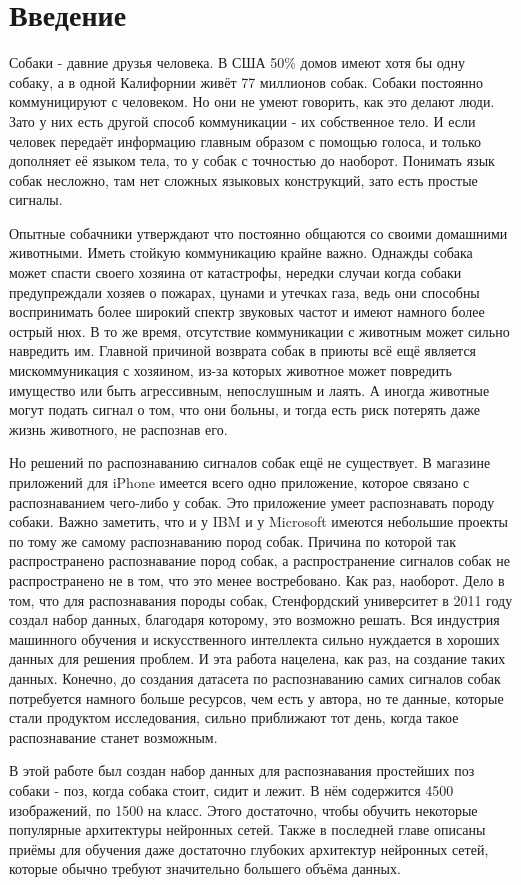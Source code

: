 \chapter*{Введение}							%

Собаки - давние друзья человека. В США 50\% домов имеют хотя бы одну собаку, а в одной Калифорнии живёт 77 миллионов собак. \cite{dog_ownership} Собаки постоянно коммуницируют с человеком. Но они не умеют говорить, как это делают люди. Зато у них есть другой способ коммуникации - их собственное тело. И если человек передаёт информацию главным образом с помощью голоса, и только дополняет её языком тела, то у собак с точностью до наоборот. Понимать язык собак несложно, там нет сложных языковых конструкций, зато есть простые сигналы. 

Опытные собачники утверждают что постоянно общаются со своими домашними животными. Иметь стойкую коммуникацию крайне важно. Однажды собака может спасти своего хозяина от катастрофы, нередки случаи когда собаки предупреждали хозяев о пожарах, цунами и утечках газа, ведь они способны воспринимать более широкий спектр звуковых частот и имеют намного более острый нюх. В то же время, отсутствие коммуникации с животным может сильно навредить им. Главной причиной возврата собак в приюты всё ещё является мискоммуникация с хозяином, из-за которых животное может повредить имущество или быть агрессивным, непослушным и лаять\cite{reasons_dogs_return_to_shelters}. А иногда животные могут подать сигнал о том, что они больны, и тогда есть риск потерять даже жизнь животного, не распознав его. 

Но решений по распознаванию сигналов собак ещё не существует. В магазине приложений для iPhone имеется всего одно приложение, которое связано с распознаванием чего-либо у собак. Это приложение умеет распознавать породу собаки. Важно заметить, что и у IBM\cite{ibm_dog} и у Microsoft\cite{microsoft_dog} имеются небольшие проекты по тому же самому распознаванию пород собак. Причина по которой так распространено распознавание пород собак, а распространение сигналов собак не распространено не в том, что это менее востребовано. Как раз, наоборот. Дело в том, что для распознавания породы собак, Стенфордский университет в 2011 году создал набор данных, благодаря которому, это возможно решать. Вся индустрия машинного обучения и искусственного интеллекта сильно нуждается в хороших данных для решения проблем. И эта работа нацелена, как раз, на создание таких данных. Конечно, до создания датасета по распознаванию самих сигналов собак потребуется намного больше ресурсов, чем есть у автора, но те данные, которые стали продуктом исследования, сильно приближают тот день, когда такое распознавание станет возможным.

В этой работе был создан набор данных для распознавания простейших поз собаки - поз, когда собака стоит, сидит и лежит. В нём содержится 4500 изображений, по 1500 на класс. Этого достаточно, чтобы обучить некоторые популярные архитектуры нейронных сетей. Также в последней главе описаны приёмы для обучения даже достаточно глубоких архитектур нейронных сетей, которые обычно требуют значительно большего объёма данных.